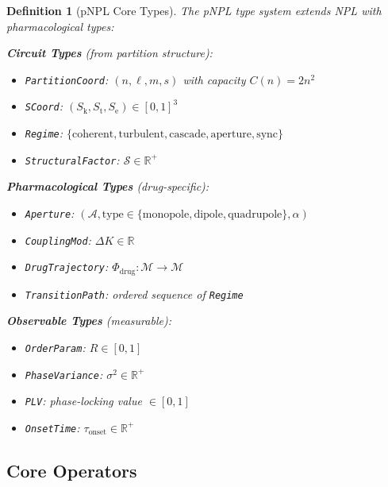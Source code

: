 \documentclass[twocolumn,10pt]{article}
\newtheorem{definition}[theorem]{Definition}
\theoremstyle{remark}
\newcommand{\Sk}{S_{\mathrm{k}}}
\newcommand{\St}{S_{\mathrm{t}}}
\newcommand{\Se}{S_{\mathrm{e}}}
\newcommand{\Rorder}{R}
\newcommand{\Mstate}{\mathcal{M}}
\begin{document}
\begin{definition}[pNPL Core Types]
\label{def:pnpl_types}
The pNPL type system extends NPL with pharmacological types:

\textbf{Circuit Types} (from partition structure):
\begin{itemize}[nosep]
  \item \texttt{PartitionCoord}: $(n, \ell, m, s)$ with capacity $C(n) = 2n^2$
  \item \texttt{SCoord}: $(\Sk, \St, \Se) \in [0,1]^3$
  \item \texttt{Regime}: $\{\text{coherent}, \text{turbulent}, \text{cascade}, \text{aperture}, \text{sync}\}$
  \item \texttt{StructuralFactor}: $\mathcal{S} \in \mathbb{R}^+$
\end{itemize}

\textbf{Pharmacological Types} (drug-specific):
\begin{itemize}[nosep]
  \item \texttt{Aperture}: $(\mathcal{A}, \text{type} \in \{\text{monopole}, \text{dipole}, \text{quadrupole}\}, \alpha)$
  \item \texttt{CouplingMod}: $\Delta K \in \mathbb{R}$
  \item \texttt{DrugTrajectory}: $\Phi_{\mathrm{drug}}: \Mstate \to \Mstate$
  \item \texttt{TransitionPath}: ordered sequence of \texttt{Regime}
\end{itemize}

\textbf{Observable Types} (measurable):
\begin{itemize}[nosep]
  \item \texttt{OrderParam}: $\Rorder \in [0, 1]$
  \item \texttt{PhaseVariance}: $\sigma^2 \in \mathbb{R}^+$
  \item \texttt{PLV}: phase-locking value $\in [0, 1]$
  \item \texttt{OnsetTime}: $\tau_{\mathrm{onset}} \in \mathbb{R}^+$
\end{itemize}
\end{definition}

\subsection{Core Operators}
\end{document}
